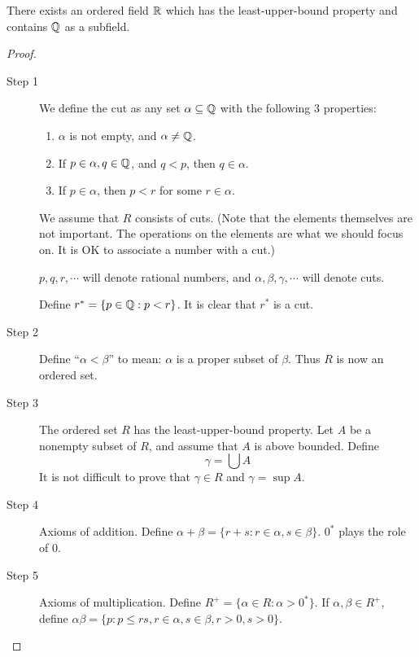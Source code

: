     \begin{theo}
        There exists an ordered field $\mathbb{R}$ which has the least-upper-bound property and contains $\mathbb{Q}$ as a subfield.
    \end{theo}
    \begin{framed}
        \begin{proof}
        \begin{description}
            \item[Step 1] We define the cut as any set $\alpha \subseteq \mathbb{Q}$ with the following 3 properties:
            \begin{enumerate}
                \item $\alpha$ is not empty, and $\alpha \neq \mathbb{Q}$.
                \item If $p \in \alpha, q \in \mathbb{Q}$, and $q < p$, then $q \in \alpha$.
                \item If $p \in \alpha$, then $p < r$ for some $r \in \alpha$.
            \end{enumerate}
            
            We assume that $R$ consists of cuts. (Note that the elements themselves are not important. The operations on the elements are what we should focus on. It is OK to associate a number with a cut.)
            
            $p,q,r,\cdots$ will denote rational numbers, and $\alpha,\beta,\gamma,\cdots$ will denote cuts.

            Define $r^* = \{ p \in \mathbb{Q} : p < r \}$. It is clear that $r^*$ is a cut.
            
            \item[Step 2] Define ``$\alpha < \beta$'' to mean: $\alpha$ is a proper subset of $\beta$. Thus $R$ is now an ordered set.
            \item[Step 3] The ordered set $R$ has the least-upper-bound property. Let $A$ be a nonempty subset of $R$, and assume that $A$ is above bounded. Define
            \begin{equation}
                \gamma = \bigcup A
            \end{equation}
            It is not difficult to prove that $\gamma \in R$ and $\gamma = \sup A$.

            \item[Step 4] Axioms of addition. Define $\alpha + \beta = \{ r+s : r \in \alpha, s \in \beta \}$. $0^*$ plays the role of $0$.

            \item[Step 5] Axioms of multiplication. Define $R^+ = \{ \alpha \in R : \alpha > 0^* \}$. If $\alpha, \beta \in R^+$, define $\alpha \beta = \{ p : p \leq rs, r \in \alpha, s \in \beta, r > 0, s > 0 \}$.


\end{description}
\end{proof}
\end{framed}
